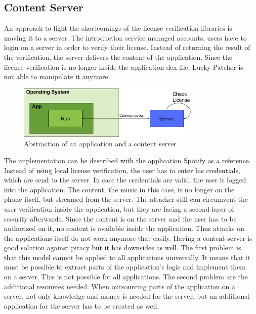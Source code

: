 \subsection{Content Server} \label{section:counter-replace-server}
An approach to fight the shortcomings of the license verification libraries is moving it to a server.
The introduction service managed accounts, users have to login on a server in order to verify their license.
Instead of returning the result of the verification, the server delivers the content of the application.
Since the license verification is no longer inside the application \gls{dex} file, Lucky Patcher is not able to manipulate it anymore.
\newline
\begin{figure}[h]
    \centering
    \includegraphics[width=0.8\textwidth]{data/contentServer.png}
    \caption{Abstraction of an application and a content server}
    \label{fig:contentServer}
\end{figure}
The implementation can be described with the application Spotify \cite{spotify} as a reference.
Instead of using local license verification, the user has to enter his credentials, which are send to the server.
In case the credentials are valid, the user is logged into the application.
The content, the music in this case, is no longer on the phone itself, but streamed from the server.
The attacker still can circumvent the user verification inside the application, but they are facing a second layer of security afterwards.
Since the content is on the server and the user has to be authorized on it, no content is available inside the application.
Thus attacks on the applications itself do not work anymore that easily.
\newline
Having a content server is good solution against piracy but it has downsides as well.
The first problem is that this model cannot be applied to all applications universally.
It means that it must be possible to extract parts of the application's logic and implement them on a server.
This is not possible for all applications.
The second problem are the additional resources needed.
When outsourcing parts of the application on a server, not only knowledge and money is needed for the server, but an additional application for the server has to be created as well.

